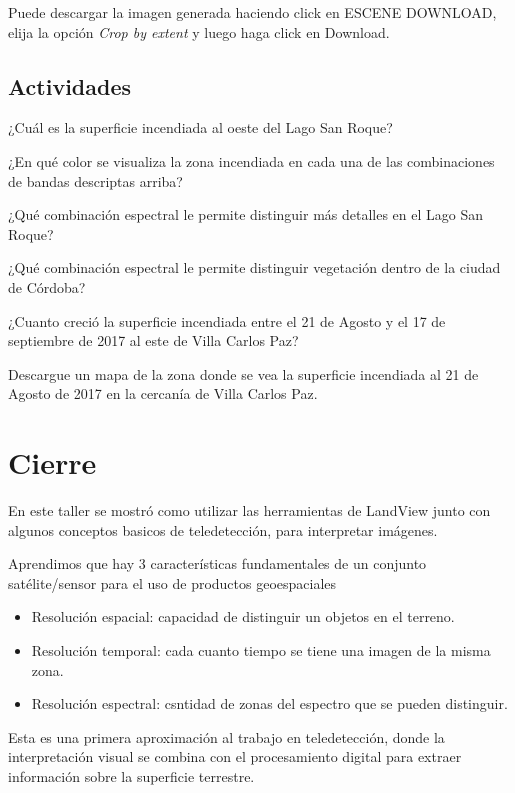 \documentclass[a4paper,12pt]{book}
\begin{document}
Puede descargar la imagen generada haciendo click en ESCENE DOWNLOAD, elija la opción  \emph{Crop by extent} y luego haga click en Download.

\section{Actividades}

\begin{que}
    ¿Cuál es la superficie incendiada al oeste del Lago San Roque?
\end{que}

\begin{que}
    ¿En qué color se visualiza la zona incendiada en cada una de las combinaciones de bandas descriptas arriba?
\end{que}

\begin{que}
    ¿Qué combinación espectral le permite distinguir más detalles en el Lago San Roque?
\end{que}

\begin{que}
    ¿Qué combinación espectral le permite distinguir vegetación dentro de la ciudad de Córdoba?
\end{que}

\begin{que}
    ¿Cuanto creció la superficie incendiada entre el 21 de Agosto y el 17 de septiembre de 2017 al este de Villa Carlos Paz?
\end{que}

\begin{que}
    Descargue un mapa de la zona donde se vea la superficie incendiada al 21 de Agosto de 2017 en la cercanía de Villa Carlos Paz.
\end{que}

\chapter{Cierre}

En este taller se mostró como utilizar las herramientas de LandView junto con algunos conceptos basicos de teledetección, para interpretar imágenes.

Aprendimos que hay 3 características fundamentales de un conjunto satélite/sensor para el uso de productos geoespaciales

\begin{itemize}
    \item Resolución espacial: capacidad de distinguir un objetos en el terreno.
    \item Resolución temporal: cada cuanto tiempo se tiene una imagen de la misma zona.
    \item Resolución espectral: csntidad de zonas del espectro que se pueden distinguir.
\end{itemize}

Esta es una primera aproximación al trabajo en teledetección, donde la interpretación visual se combina con el procesamiento digital para extraer información sobre la superficie terrestre.
\end{document}
